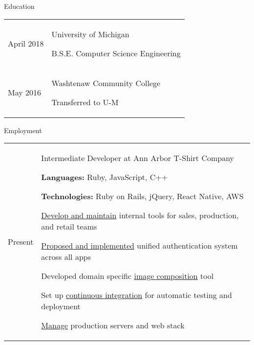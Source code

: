 \documentclass[12pt]{article}
\renewcommand{\section}[1]{{\Huge{#1}}\vspace{2 mm}}
\newenvironment{timeline}
        {\begin{tabular}{p{21 mm}|p{150 mm}}}
        {\end{tabular}}
\newenvironment{timelinetitle}
        {\vspace{-2 mm}\begin{large}}
        {\end{large}\vspace{-1.5 mm}}
\newcommand{\timespan}[2]{{#2}\newline{#1}}
\newcommand{\resumeitem}{\newline\vspace{3 mm}\hspace{3 mm}}
\newcommand{\resumestart}{\vspace{1 mm}}
\begin{document}
\section{Education}
\hline

\begin{timeline}
\timespan{Sept. 2016}{April 2018}
&
\begin{timelinetitle}
    University of Michigan
\end{timelinetitle}
\hspace{16mm}
B.S.E. Computer Science Engineering
\vspace{3 mm}

\\

\timespan{Sept. 2012}{May 2016}
&
\begin{timelinetitle}
    Washtenaw Community College
\end{timelinetitle}
\hspace{29mm}
Transferred to U-M

\end{timeline}

\vspace{3.0 mm}
\section{Employment}
\hline

\begin{timeline}
\timespan{Feb. 2014}{Present}
&
\begin{timelinetitle}
    Intermediate Developer at Ann Arbor T-Shirt Company
\end{timelinetitle}
\resumestart

\resumeitem \textbf{Languages:} Ruby, JavaScript, C++

\resumeitem \textbf{Technologies:} Ruby on Rails, jQuery, React Native, AWS

\resumeitem \underline{Develop and maintain} internal tools for sales, production, and retail teams

\resumeitem \underline{Proposed and implemented} unified authentication system across all apps

\resumeitem Developed domain specific \underline{image composition} tool

\resumeitem Set up \underline{continuous integration} for automatic testing and deployment

\resumeitem \underline{Manage} production servers and web stack

\end{timeline}
\end{document}

